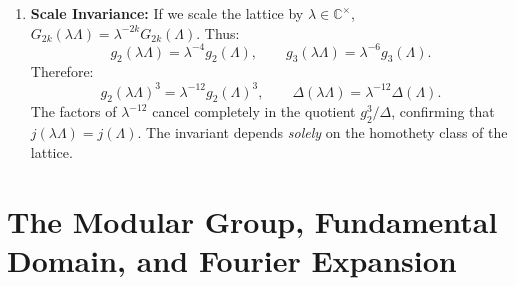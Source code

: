 \documentclass[a4paper]{article}
\begin{document}
\begin{enumerate}[leftmargin=2em]
 \item \textbf{Scale Invariance:}
 If we scale the lattice by $\lambda \in \mathbb{C}^\times$, $G_{2k}(\lambda \Lambda) = \lambda^{-2k} G_{2k}(\Lambda)$. Thus:
 \begin{equation}
  g_2(\lambda \Lambda) = \lambda^{-4} g_2(\Lambda), \qquad g_3(\lambda \Lambda) = \lambda^{-6} g_3(\Lambda).
 \end{equation}
 Therefore:
 \begin{equation}
  g_2(\lambda \Lambda)^3 = \lambda^{-12} g_2(\Lambda)^3, \qquad \Delta(\lambda \Lambda) = \lambda^{-12} \Delta(\Lambda).
 \end{equation}
 The factors of $\lambda^{-12}$ cancel completely in the quotient $g_2^3/\Delta$, confirming that $j(\lambda \Lambda) = j(\Lambda)$. The invariant depends \emph{solely} on the homothety class of the lattice.
\end{enumerate}

\section{The Modular Group, Fundamental Domain, and Fourier Expansion}
\label{sec:modular_group_fourier}
\end{document}
